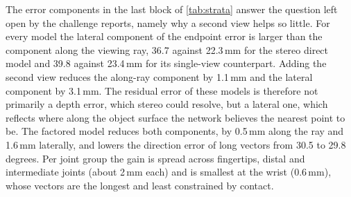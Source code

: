 The error components in the last block of \cref{tab:strata} answer the question left open by the challenge reports, namely why a second view helps so little. For every model the lateral component of the endpoint error is larger than the component along the viewing ray, 36.7 against 22.3\,mm for the stereo direct model and 39.8 against 23.4\,mm for its single-view counterpart. Adding the second view reduces the along-ray component by 1.1\,mm and the lateral component by 3.1\,mm. The residual error of these models is therefore not primarily a depth error, which stereo could resolve, but a lateral one, which reflects where along the object surface the network believes the nearest point to be. The factored model reduces both components, by 0.5\,mm along the ray and 1.6\,mm laterally, and lowers the direction error of long vectors from 30.5 to 29.8 degrees. Per joint group the gain is spread across fingertips, distal and intermediate joints (about 2\,mm each) and is smallest at the wrist (0.6\,mm), whose vectors are the longest and least constrained by contact.
